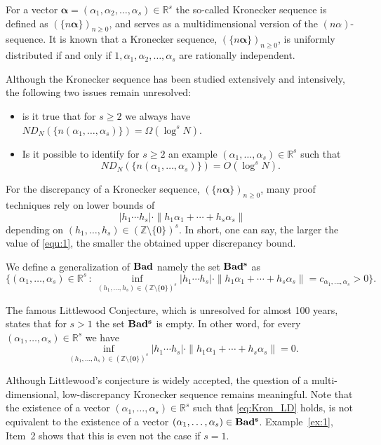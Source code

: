 \documentclass{article}
\newcommand{\bsalpha}{\boldsymbol{\alpha}}%
\newcommand{\ZZ}{\mathbb Z}
\newcommand{\RR}{\mathbb R}
\renewcommand{\(}{\left (}
\renewcommand{\)}{\right )}
\theoremstyle{definition}
\numberwithin{equation}{section}
\begin{document}
For a vector $\bsalpha=(\alpha_1,\alpha_2,\ldots,\alpha_s)\in\RR^s$ the so-called Kronecker sequence is defined as
	$(\{n\bsalpha\})_{n\geq 0}$, and serves as a multidimensional version of the $(n \alpha)$-sequence. It is known that a Kronecker sequence, $(\{n\bsalpha\})_{n\geq 0}$, is {uniformly distributed} if and only if $1,\alpha_1,\alpha_2,\ldots,\alpha_s$ are rationally independent. 

Although the Kronecker sequence has been studied extensively and intensively, the following two issues remain unresolved:

	\begin{itemize}
		\item is it true that for $s\geq 2$ we always have $ND_N(\{n(\alpha_1,\ldots,\alpha_s)\})=\Omega(\log^s N ) $.
		\item Is it possible to identify for $s\geq 2$ an example $(\alpha_1,\ldots,\alpha_s)\in\RR^s$ such that
		\begin{equation}\label{eq:Kron_LD}
		ND_N(\{n(\alpha_1,\ldots,\alpha_s)\})=O(\log^s N)  .
		\end{equation}
\end{itemize}

For the discrepancy of a Kronecker sequence, $(\{n\bsalpha\})_{n\geq 0}$, many proof techniques rely on lower bounds of
\begin{equation}\label{equ:1}
	|h_1\cdots h_s| \cdot\|h_1\alpha_1+\cdots+h_s\alpha_s\|
\end{equation}
depending on $(h_1,\ldots,h_s)\in(\ZZ\setminus\{0\})^s$. In short, one can say, the larger the value of \eqref{equ:1}, the smaller the obtained upper discrepancy bound.


We define a generalization of ${\bf{Bad}}$ namely the set ${\bf{Bad^s}}$ as {\small \begin{equation}\label{eq:LC1} \{(\alpha_1,\ldots,\alpha_s) \in\RR^s\,:\, \inf_{(h_1,\ldots,h_s)\in(\ZZ\setminus\{\boldsymbol{0}\})^s} |h_1\cdots h_s| \cdot\|h_1\alpha_1+\cdots+h_s\alpha_s\|=c_{\alpha_1,\ldots,\alpha_s}>0\}.\end{equation}}


The famous {Littlewood Conjecture}, which is unresolved for almost 100 years, states that for $s>1$ the set ${\bf{Bad^s}}$ is empty. In other word, for every $(\alpha_1,\ldots,\alpha_s) \in\RR^s$ we have
$$\inf_{(h_1,\ldots,h_s)\in(\ZZ\setminus\{\boldsymbol{0}\})^s} |h_1\cdots h_s| \cdot\|h_1\alpha_1+\cdots+h_s\alpha_s\|=0.$$


Although Littlewood's conjecture is widely accepted, the question of a multi-dimensional, low-discrepancy Kronecker sequence remains meaningful. Note that the existence of a vector $(\alpha_1,\ldots,\alpha_s)\in\RR^s$ such that \eqref{eq:Kron_LD} holds, is not equivalent to the existence of a vector $(\alpha_1,\ldots,\alpha_s)\in{\bf{Bad^s}}$. Example~\ref{ex:1}, Item~2 shows that this is even not the case if $s=1$.  
\end{document}
